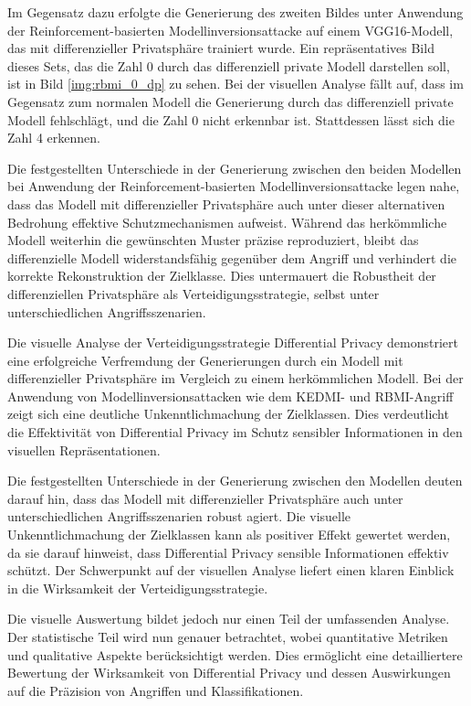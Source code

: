 Im Gegensatz dazu erfolgte die Generierung des zweiten Bildes unter Anwendung der Reinforcement-basierten Modellinversionsattacke auf einem VGG16-Modell, das mit differenzieller Privatsphäre trainiert wurde. Ein repräsentatives Bild dieses Sets, das die Zahl 0 durch das differenziell private Modell darstellen soll, ist in Bild \ref{img:rbmi_0_dp} zu sehen. Bei der visuellen Analyse fällt auf, dass im Gegensatz zum normalen Modell die Generierung durch das differenziell private Modell fehlschlägt, und die Zahl 0 nicht erkennbar ist. Stattdessen lässt sich die Zahl 4 erkennen.

Die festgestellten Unterschiede in der Generierung zwischen den beiden Modellen bei Anwendung der Reinforcement-basierten Modellinversionsattacke legen nahe, dass das Modell mit differenzieller Privatsphäre auch unter dieser alternativen Bedrohung effektive Schutzmechanismen aufweist. Während das herkömmliche Modell weiterhin die gewünschten Muster präzise reproduziert, bleibt das differenzielle Modell widerstandsfähig gegenüber dem Angriff und verhindert die korrekte Rekonstruktion der Zielklasse. Dies untermauert die Robustheit der differenziellen Privatsphäre als Verteidigungsstrategie, selbst unter unterschiedlichen Angriffsszenarien.

Die visuelle Analyse der Verteidigungsstrategie \glqq Differential Privacy\grqq{} demonstriert eine erfolgreiche Verfremdung der Generierungen durch ein Modell mit differenzieller Privatsphäre im Vergleich zu einem herkömmlichen Modell. Bei der Anwendung von Modellinversionsattacken wie dem \glqq KEDMI\grqq- und \glqq RBMI\grqq-Angriff zeigt sich eine deutliche Unkenntlichmachung der Zielklassen. Dies verdeutlicht die Effektivität von Differential Privacy im Schutz sensibler Informationen in den visuellen Repräsentationen.

Die festgestellten Unterschiede in der Generierung zwischen den Modellen deuten darauf hin, dass das Modell mit differenzieller Privatsphäre auch unter unterschiedlichen Angriffsszenarien robust agiert. Die visuelle Unkenntlichmachung der Zielklassen kann als positiver Effekt gewertet werden, da sie darauf hinweist, dass Differential Privacy sensible Informationen effektiv schützt. Der Schwerpunkt auf der visuellen Analyse liefert einen klaren Einblick in die Wirksamkeit der Verteidigungsstrategie.

Die visuelle Auswertung bildet jedoch nur einen Teil der umfassenden Analyse. Der statistische Teil wird nun genauer betrachtet, wobei quantitative Metriken und qualitative Aspekte berücksichtigt werden. Dies ermöglicht eine detailliertere Bewertung der Wirksamkeit von Differential Privacy und dessen Auswirkungen auf die Präzision von Angriffen und Klassifikationen.

